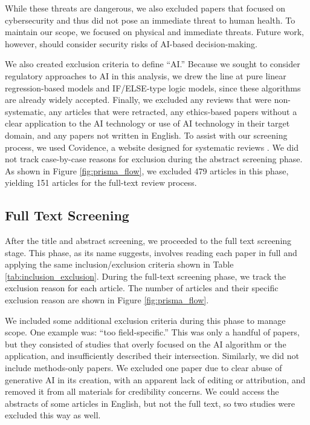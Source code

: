 \documentclass[preprint,12pt]{elsarticle}
\providecommand{\DIFaddbegin}{} %
\providecommand{\DIFaddend}{} %
\providecommand{\DIFaddbeginFL}{} %
\providecommand{\DIFaddendFL}{} %
\providecommand{\DIFdelbeginFL}{} %
\providecommand{\DIFdelendFL}{} %
\newcommand{\DIFscaledelfig}{0.5}
\newlength{\DIFdelgraphicswidth} %
\newlength{\DIFdelgraphicsheight} %
\newcommand{\DIFaddincludegraphics}[2][]{{\color{blue}\fbox{\DIFOincludegraphics[#1]{#2}}}} %
\newcommand{\DIFdelincludegraphics}[2][]{%
\sbox{\DIFdelgraphicsbox}{\DIFOincludegraphics[#1]{#2}}%
\settoboxwidth{\DIFdelgraphicswidth}{\DIFdelgraphicsbox} %
\settoboxtotalheight{\DIFdelgraphicsheight}{\DIFdelgraphicsbox} %
\scalebox{\DIFscaledelfig}{%
\parbox[b]{\DIFdelgraphicswidth}{\usebox{\DIFdelgraphicsbox}\\[-\baselineskip] \rule{\DIFdelgraphicswidth}{0em}}\llap{\resizebox{\DIFdelgraphicswidth}{\DIFdelgraphicsheight}{%
\setlength{\unitlength}{\DIFdelgraphicswidth}%
\begin{picture}(1,1)%
\thicklines\linethickness{2pt} %
{\color[rgb]{1,0,0}\put(0,0){\framebox(1,1){}}}%
{\color[rgb]{1,0,0}\put(0,0){\line( 1,1){1}}}%
{\color[rgb]{1,0,0}\put(0,1){\line(1,-1){1}}}%
\end{picture}%
}\hspace*{3pt}}} %
} %
\DeclareRobustCommand{\DIFaddbegin}{\DIFOaddbegin \let\includegraphics\DIFaddincludegraphics} %
\DeclareRobustCommand{\DIFaddend}{\DIFOaddend \let\includegraphics\DIFOincludegraphics} %
\DeclareRobustCommand{\DIFaddbeginFL}{\DIFOaddbeginFL \let\includegraphics\DIFaddincludegraphics} %
\DeclareRobustCommand{\DIFaddendFL}{\DIFOaddendFL \let\includegraphics\DIFOincludegraphics} %
\DeclareRobustCommand{\DIFdelbeginFL}{\DIFOdelbeginFL \let\includegraphics\DIFdelincludegraphics} %
\DeclareRobustCommand{\DIFdelendFL}{\DIFOaddendFL \let\includegraphics\DIFOincludegraphics} %
\begin{document}
While these threats are dangerous, we also excluded papers that focused on
cybersecurity and thus did not pose an immediate threat to human health. To
maintain our scope, we focused on physical and immediate threats. Future work,
however, should consider security risks of AI-based decision-making.

We also created exclusion criteria to define ``AI.'' Because we sought to
consider regulatory approaches to AI in this analysis, we drew the line at pure
linear regression-based models and IF/ELSE-type logic models, since these
algorithms are already widely accepted. Finally, we excluded any reviews that
were non-systematic, any articles that were retracted, any ethics-based papers
without a clear application to the AI technology or use of AI technology in
their target domain, and any papers not written in English. To assist with our
screening process, we used Covidence, a website designed for systematic reviews
\cite{covidence}. We did not track case-by-case reasons for exclusion during the
abstract screening phase. As shown in Figure \ref{fig:prisma_flow}, we excluded
479 articles in this phase, yielding 151 articles for the full-text review
process.

\begin{table}[h]
\renewcommand{\arraystretch}{1.5}
\DIFdelbeginFL %
\DIFdelendFL \caption{Inclusion and exclusion criteria used for abstract screening phase.}
\DIFaddbeginFL 
\DIFaddendFL \label{tab:inclusion_exclusion}
\end{table}

\DIFaddbegin \FloatBarrier

\DIFaddend \subsection{Full Text Screening}
After the title and abstract screening, we proceeded to the full text screening
stage. This phase, as its name suggests, involves reading each paper in full and
applying the same inclusion/exclusion criteria shown in Table
\ref{tab:inclusion_exclusion}. During the full-text screening phase, we track
the exclusion reason for each article. The number of articles and their specific
exclusion reason are shown in Figure \ref{fig:prisma_flow}. 

We included some additional exclusion criteria during this phase to manage
scope. One example was: ``too field-specific.'' This was only a handful of
papers, but they consisted of studies that overly focused on the AI algorithm or
the application, and insufficiently described their intersection. Similarly, we
did not include methods-only papers. We excluded one paper due to clear abuse of
generative AI in its creation, with an apparent lack of editing or attribution,
and removed it from all materials for credibility concerns. We could access the
abstracts of some articles in English, but not the full text, so two studies
were excluded this way as well. 
\end{document}
